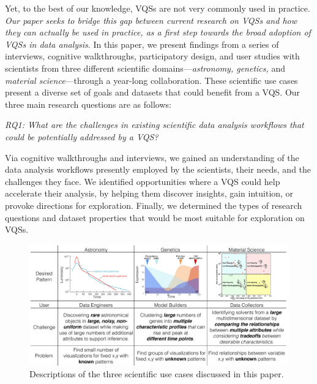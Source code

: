Yet, to the best of our knowledge, 
VQSs are not very commonly used in practice.
{\em Our paper seeks to bridge this gap between current research on VQSs  and how they can actually be used in practice, as a first step towards the broad adoption of VQSs in data analysis}. 
In this paper, we present findings from a series of interviews, cognitive walkthroughs, participatory design, and user studies with scientists from three different scientific 
domains---{\em astronomy, genetics,} and {\em material science}---through a year-long collaboration.
These scientific use cases present a diverse set of goals and datasets that could benefit from a VQS. Our three main research questions are as follows:
\par \emph{RQ1: What are the challenges in existing scientific data analysis workflows that could be potentially addressed by a VQS?}

Via cognitive walkthroughs and interviews,
we gained an understanding of the data analysis 
workflows presently employed by the scientists, their needs,
and the challenges they face. 
We identified opportunities where a VQS could
help accelerate their analysis, by helping them
discover insights, gain intuition, or provoke directions
for exploration. Finally, we determined the types of 
research questions and dataset properties that would
be most suitable for exploration on VQSs.
\begin{figure}[ht!]
\centering
\vspace{-15pt}
\includegraphics[width=0.8\linewidth]{figures/sci_challenge_tbl.pdf}
\vspace{-6pt}\caption{Descriptions of the three scientific use cases discussed in this paper.}
\label{example}
\vspace{-10pt}
\end{figure}

